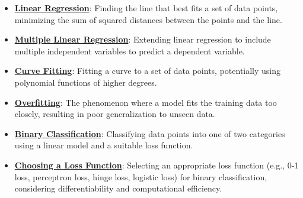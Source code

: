 \documentclass{article}%
\begin{document}
\begin{itemize}[leftmargin=*]%
\item \href{https://purdue.brightspace.com/d2l/common/assets/pdfjs-d2l-dist/1.0.14-legacy/web/viewer.html?file=%2Fcontent%2Fenforced%2F1095467-wl.202510.CS.24300.001%2F05L2-ML Basics.pdf%3Fou%3D1095467&lang=en-us&container=d2l-fileviewer-rendered-pdf&fullscreen=d2l-fileviewer-rendered-pdf-dialog&height=667#page=6}{\textbf{Linear Regression}}: Finding the line that best fits a set of data points, minimizing the sum of squared distances between the points and the line.%
\item \href{https://purdue.brightspace.com/d2l/common/assets/pdfjs-d2l-dist/1.0.14-legacy/web/viewer.html?file=%2Fcontent%2Fenforced%2F1095467-wl.202510.CS.24300.001%2F05L2-ML Basics.pdf%3Fou%3D1095467&lang=en-us&container=d2l-fileviewer-rendered-pdf&fullscreen=d2l-fileviewer-rendered-pdf-dialog&height=667#page=11}{\textbf{Multiple Linear Regression}}: Extending linear regression to include multiple independent variables to predict a dependent variable.%
\item \href{https://purdue.brightspace.com/d2l/common/assets/pdfjs-d2l-dist/1.0.14-legacy/web/viewer.html?file=%2Fcontent%2Fenforced%2F1095467-wl.202510.CS.24300.001%2F05L2-ML Basics.pdf%3Fou%3D1095467&lang=en-us&container=d2l-fileviewer-rendered-pdf&fullscreen=d2l-fileviewer-rendered-pdf-dialog&height=667#page=13}{\textbf{Curve Fitting}}: Fitting a curve to a set of data points, potentially using polynomial functions of higher degrees.%
\item \href{https://purdue.brightspace.com/d2l/common/assets/pdfjs-d2l-dist/1.0.14-legacy/web/viewer.html?file=%2Fcontent%2Fenforced%2F1095467-wl.202510.CS.24300.001%2F05L2-ML Basics.pdf%3Fou%3D1095467&lang=en-us&container=d2l-fileviewer-rendered-pdf&fullscreen=d2l-fileviewer-rendered-pdf-dialog&height=667#page=14}{\textbf{Overfitting}}: The phenomenon where a model fits the training data too closely, resulting in poor generalization to unseen data.%
\item \href{https://purdue.brightspace.com/d2l/common/assets/pdfjs-d2l-dist/1.0.14-legacy/web/viewer.html?file=%2Fcontent%2Fenforced%2F1095467-wl.202510.CS.24300.001%2F05L2-ML Basics.pdf%3Fou%3D1095467&lang=en-us&container=d2l-fileviewer-rendered-pdf&fullscreen=d2l-fileviewer-rendered-pdf-dialog&height=667#page=20}{\textbf{Binary Classification}}: Classifying data points into one of two categories using a linear model and a suitable loss function.%
\item \href{https://purdue.brightspace.com/d2l/common/assets/pdfjs-d2l-dist/1.0.14-legacy/web/viewer.html?file=%2Fcontent%2Fenforced%2F1095467-wl.202510.CS.24300.001%2F05L2-ML Basics.pdf%3Fou%3D1095467&lang=en-us&container=d2l-fileviewer-rendered-pdf&fullscreen=d2l-fileviewer-rendered-pdf-dialog&height=667#page=25}{\textbf{Choosing a Loss Function}}: Selecting an appropriate loss function (e.g., 0-1 loss, perceptron loss, hinge loss, logistic loss) for binary classification, considering differentiability and computational efficiency.%

\end{itemize}
\end{document}
